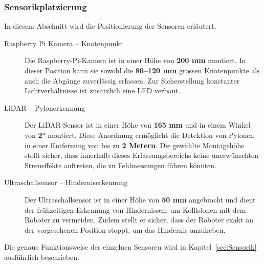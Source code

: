 \documentclass[main.tex]{subfiles} %
\begin{document}
\subsubsection{Sensorikplatzierung}

In diesem Abschnitt wird die Positionierung der Sensoren erläutert.

\begin{description}
    \item[Raspberry Pi Kamera – Knotenpunkt] Die Raspberry-Pi-Kamera ist in einer Höhe von \textbf{200 mm} montiert. In dieser Position kann 
        sie sowohl die \textbf{80–120 mm} grossen Knotenpunkte als auch die Abgänge zuverlässig erfassen. 
        Zur Sicherstellung konstanter Lichtverhältnisse ist zusätzlich eine LED verbaut.
    
    \item[LiDAR – Pylonerkennung] Der LiDAR-Sensor ist in einer Höhe von \textbf{165 mm} und in einem Winkel von \textbf{2°} montiert. 
        Diese Anordnung ermöglicht die Detektion von Pylonen in einer Entfernung von bis zu \textbf{2 Metern}. 
        Die gewählte Montagehöhe stellt sicher, dass innerhalb dieses Erfassungsbereichs keine unerwünschten 
        Streueffekte auftreten, die zu Fehlmessungen führen könnten. 
    
    \item[Ultraschallsensor – Hinderniserkennung] Der Ultraschallsensor ist in einer Höhe von \textbf{50 mm} angebracht und dient der frühzeitigen 
        Erkennung von Hindernissen, um Kollisionen mit dem Roboter zu vermeiden. Zudem stellt er sicher, 
        dass der Roboter exakt an der vorgesehenen Position stoppt, um das Hindernis anzuheben. 

\end{description}

Die genaue Funktionsweise der einzelnen Sensoren wird in Kapitel~\ref{sec:Sensorik} ausführlich beschrieben.
\end{document}
